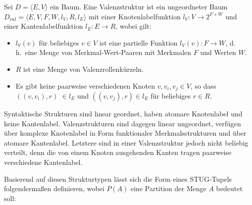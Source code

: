 \begin{definition}[Valenzstruktur]
Sei $D = \langle E,V \rangle$ ein Baum. Eine Valenzstruktur ist ein ungeordneter Baum $D_{\mathit{val}} = \langle E,V,F,W,l_V,R,l_E \rangle$ mit einer Knotenlabelfunktion $l_V : V \to 2^{F \times W}$ und einer Kantenlabelfunktion $l_E: E \to R$, wobei gilt:
\begin{itemize} 
  \item $l_V(v)$ für beliebiges $v \in V$ ist eine partielle Funktion $l_V(v): F \to W$, d.\,h.\ eine Menge von Merkmal-Wert-Paaren mit Merkmalen $F$ und Werten $W$.
  \item $R$ ist eine Menge von Valenzrollenkürzeln.
  \item Es gibt keine paarweise verschiedenen Knoten $v, v_i, v_j \in V$, so dass $((v,v_i),r)$ $\in l_E$ und $((v,v_j),r) \in l_E$ für beliebiges $r \in R$.
\end{itemize}  
\end{definition}
Syntaktische Strukturen sind linear geordnet, haben atomare Knotenlabel und keine Kantenlabel. Valenzstrukturen sind dagegen linear ungeordnet, verfügen über komplexe Knotenlabel in Form funktionaler Merkmalsstrukturen und über atomare Kantenlabel. Letztere sind in einer Valenzstruktur jedoch nicht beliebig verteilt, denn die von einem Knoten ausgehenden Kanten tragen paarweise verschiedene Kantenlabel.	

Basierend auf diesen Strukturtypen lässt sich die Form eines STUG-Tupels folgenderma\ss en definieren, wobei $P(A)$ eine Partition der Menge $A$ bedeutet soll:

